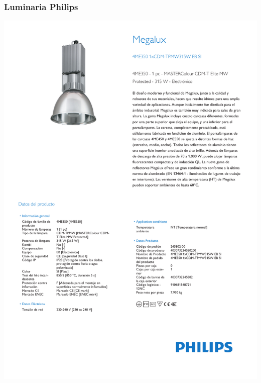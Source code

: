 \subsubsection{Luminaria Philips}
\hspace*{-2cm}
\includegraphics[page=2]{Datasheets/ph3.pdf}
\newpage